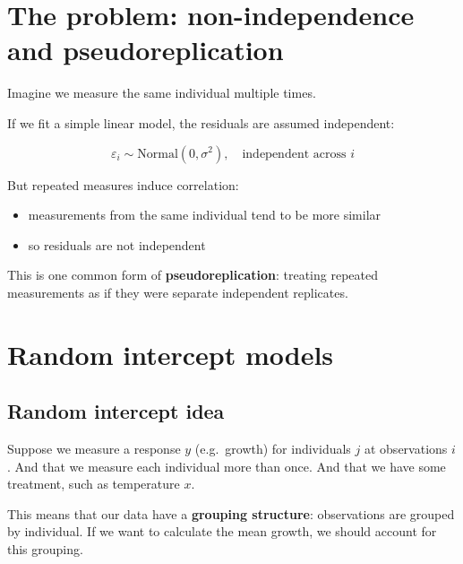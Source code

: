 \documentclass[
  letterpaper,
  8pt,
  a4paper]{book}
\providecommand{\tightlist}{%
  \setlength{\itemsep}{0pt}\setlength{\parskip}{0pt}}
\begin{document}
\section*{The problem: non-independence and
pseudoreplication}\label{the-problem-non-independence-and-pseudoreplication}


Imagine we measure the same individual multiple times.

If we fit a simple linear model, the residuals are assumed independent:

\[\varepsilon_i \sim \text{Normal}(0, \sigma^2), \quad \text{independent across } i\]

But repeated measures induce correlation:

\begin{itemize}
\tightlist
\item
  measurements from the same individual tend to be more similar
\item
  so residuals are not independent
\end{itemize}

This is one common form of \textbf{pseudoreplication}: treating repeated
measurements as if they were separate independent replicates.

\section*{Random intercept models}\label{random-intercept-models}


\subsection*{Random intercept idea}\label{random-intercept-idea}

Suppose we measure a response \(y\) (e.g.~growth) for individuals \(j\)
at observations \(i\). And that we measure each individual more than
once. And that we have some treatment, such as temperature \(x\).

This means that our data have a \textbf{grouping structure}:
observations are grouped by individual. If we want to calculate the mean
growth, we should account for this grouping.
\end{document}
